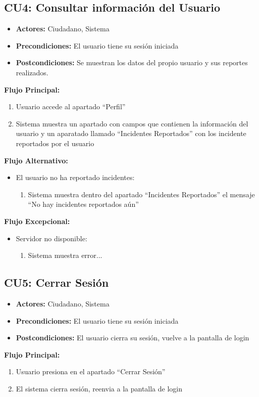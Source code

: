 \begin{multicols}{2}
\subsection*{CU4: Consultar información del      Usuario}
\begin{itemize}
    \item \textbf{Actores:} Ciudadano, Sistema
    \item \textbf{Precondiciones:} El usuario tiene su sesión iniciada
    \item \textbf{Postcondiciones:} Se muestran los datos del propio usuario y sus reportes realizados.
\end{itemize}
\textbf{Flujo Principal:}
\begin{enumerate}
    \item Usuario accede al apartado ``Perfil''
    \item Sistema muestra un apartado con campos que contienen la información del usuario y un aparatado llamado ``Incidentes Reportados'' con los incidente reportados por el usuario
\end{enumerate}

\textbf{Flujo Alternativo:}
\begin{itemize}
    \item El usuario no ha reportado incidentes:
    \begin{enumerate}
        \item Sistema muestra dentro del apartado ``Incidentes Reportados'' el mensaje ``No hay incidentes reportados aún'' 
    \end{enumerate}
\end{itemize}

\textbf{Flujo Excepcional:}
\begin{itemize}
    \item Servidor no disponible:
    \begin{enumerate}
        \item Sistema muestra error...
    \end{enumerate}
\end{itemize}

\subsection*{CU5: Cerrar Sesión}
\begin{itemize}
    \item \textbf{Actores:} Ciudadano, Sistema
    \item \textbf{Precondiciones:} El usuario tiene su sesión iniciada
    \item \textbf{Postcondiciones:} El usuario cierra su sesión, vuelve a la pantalla de login
\end{itemize}
\textbf{Flujo Principal:}
\begin{enumerate}
    \item Usuario presiona en el apartado ``Cerrar Sesión''
    \item El sistema cierra sesión, reenvia a la pantalla de login
\end{enumerate}


\end{multicols}
